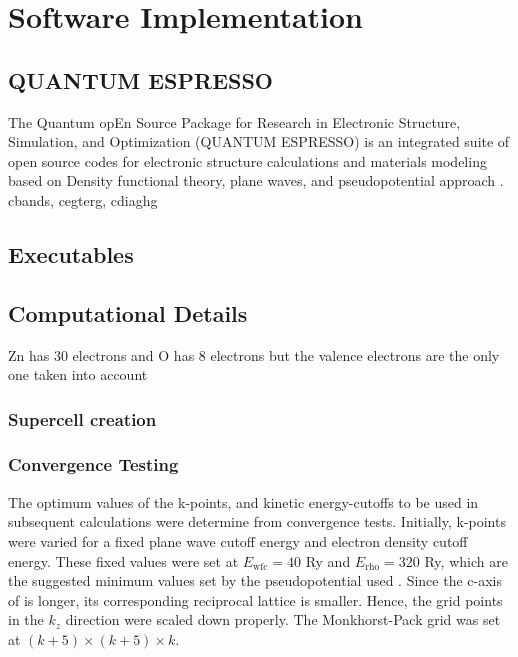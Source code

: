 \chapter{Software Implementation}
    \section{QUANTUM ESPRESSO}
    The Quantum opEn  Source  Package  for  Research  in  Electronic  Structure, Simulation, and Optimization (QUANTUM ESPRESSO) is an integrated suite of open source codes for electronic structure calculations and materials modeling based on Density functional theory, plane waves, and pseudopotential approach \citep{Giannozzi2009,Giannozzi2017}. 
            cbands, cegterg, cdiaghg 
    \section{Executables}
    \section{Computational Details}
    Zn has 30 electrons and O has 8 electrons but the valence electrons are the only one taken into account
        \subsection{Supercell creation}

        \subsection{Convergence Testing}
        The optimum values of the k-points, and kinetic energy-cutoffs  to be used in subsequent calculations were determine from convergence tests. Initially, k-points were varied for a fixed plane wave cutoff energy and electron density cutoff energy. These fixed values were set at $E_{\text{wfc}} = 40$ Ry and $E_{\text{rho}} = 320$ Ry, which are the suggested minimum values set by the pseudopotential used \citep{Garrity2014}.  Since the c-axis of  is longer, its corresponding reciprocal lattice is smaller. Hence, the grid points in the $k_z$ direction were scaled down properly. The Monkhorst-Pack grid was set at $(k+5) \times (k +5 ) \times k$.




